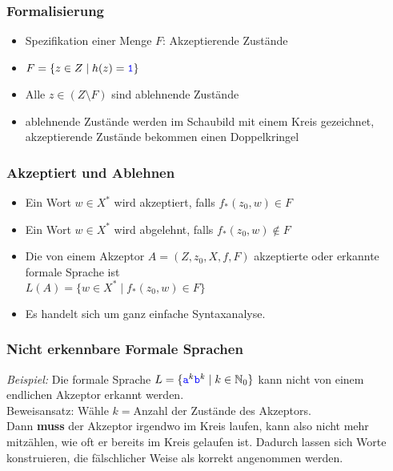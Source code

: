 \documentclass{article}
\newcommand{\Nz}{{\mathbb{N}_0}} %
\newcommand{\blue}[1]{\textcolor{blue}{#1}}
\newcommand{\important}[1]{\textcolor{importantColor}{#1}}
\newcommand{\example}[1]{\textit{Beispiel: }#1}
\newcommand{\word}[1]{\blue{\texttt{#1}}}
\newcommand{\set}[1]{\{#1\}}
\newcommand{\anfuehrung}[1]{\flqq #1\frqq}
\begin{document}
\subsubsection{Formalisierung}
\begin{itemize}
    \item Spezifikation einer Menge $F$: \important{Akzeptierende Zustände}
    \item $F=\set{z\in Z\mid h(z)=\word{1}}$
    \item Alle $z\in (Z\setminus F)$ sind \important{ablehnende Zustände}
    \item ablehnende Zustände werden im Schaubild mit einem Kreis gezeichnet, akzeptierende Zustände bekommen einen \anfuehrung{Doppelkringel}
\end{itemize}

\subsubsection{Akzeptiert und Ablehnen}
\begin{itemize}
    \item Ein Wort $w\in X^*$ wird \important{akzeptiert}, falls $f_*(z_0, w)\in F$
    \item Ein Wort $w\in X^*$ wird \important{abgelehnt}, falls $f_*(z_0, w)\notin F$
    \item Die von einem Akzeptor $A=(Z,z_0,X,f,F)$ \important{akzeptierte} oder \important{erkannte formale Sprache} ist\\
    $L(A)=\set{w\in X^*\mid f_*(z_0,w)\in F}$
    \item Es handelt sich um ganz einfache Syntaxanalyse.
\end{itemize}

\subsubsection{Nicht erkennbare Formale Sprachen}
\example{Die formale Sprache $L=\set{\word{a}^k\word{b}^k \mid k\in\Nz}$ kann nicht von einem endlichen Akzeptor erkannt werden.}\\
Beweisansatz: Wähle $k=$Anzahl der Zustände des Akzeptors.\\
Dann \textbf{muss} der Akzeptor irgendwo \anfuehrung{im Kreis laufen}, kann also nicht mehr mitzählen, wie oft er bereits im Kreis gelaufen ist. Dadurch lassen sich Worte konstruieren, die fälschlicher Weise als korrekt angenommen werden.

\end{document}
